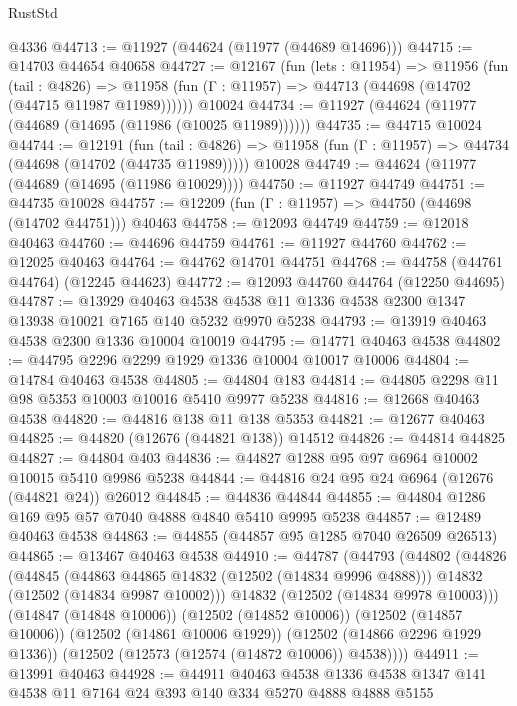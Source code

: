 \begin{lexlean}{RustStd}
\begin{coremodule}
    @4336
@44713 := @11927 (@44624 (@11977 (@44689 @14696)))
@44715 := @14703 @44654 @40658
@44727 := @12167
    (fun (lets : @11954) =>
    @11956
      (fun (tail : @4826) =>
      @11958 (fun (Γ : @11957) => @44713 (@44698 (@14702 (@44715 @11987 @11989))))))
    @10024
@44734 := @11927 (@44624 (@11977 (@44689 (@14695 (@11986 (@10025 @11989))))))
@44735 := @44715 @10024
@44744 := @12191
    (fun (tail : @4826) => @11958 (fun (Γ : @11957) => @44734 (@44698 (@14702 (@44735 @11989)))))
    @10028
@44749 := @44624 (@11977 (@44689 (@14695 (@11986 @10029))))
@44750 := @11927 @44749
@44751 := @44735 @10028
@44757 := @12209 (fun (Γ : @11957) => @44750 (@44698 (@14702 @44751))) @40463
@44758 := @12093 @44749
@44759 := @12018 @40463
@44760 := @44696 @44759
@44761 := @11927 @44760
@44762 := @12025 @40463
@44764 := @44762 @14701 @44751
@44768 := @44758 (@44761 @44764) (@12245 @44623)
@44772 := @12093 @44760 @44764 (@12250 @44695)
@44787 := @13929
    @40463
    @4538
    @4538
    @11
    @1336
    @4538
    @2300
    @1347
    @13938
    @10021
    @7165
    @140
    @5232
    @9970
    @5238
@44793 := @13919 @40463 @4538 @2300 @1336 @10004 @10019
@44795 := @14771 @40463 @4538
@44802 := @44795 @2296 @2299 @1929 @1336 @10004 @10017 @10006
@44804 := @14784 @40463 @4538
@44805 := @44804 @183
@44814 := @44805 @2298 @11 @98 @5353 @10003 @10016 @5410 @9977 @5238
@44816 := @12668 @40463 @4538
@44820 := @44816 @138 @11 @138 @5353
@44821 := @12677 @40463
@44825 := @44820 (@12676 (@44821 @138)) @14512
@44826 := @44814 @44825
@44827 := @44804 @403
@44836 := @44827 @1288 @95 @97 @6964 @10002 @10015 @5410 @9986 @5238
@44844 := @44816 @24 @95 @24 @6964 (@12676 (@44821 @24)) @26012
@44845 := @44836 @44844
@44855 := @44804 @1286 @169 @95 @57 @7040 @4888 @4840 @5410 @9995 @5238
@44857 := @12489 @40463 @4538
@44863 := @44855 (@44857 @95 @1285 @7040 @26509 @26513)
@44865 := @13467 @40463 @4538
@44910 := @44787
    (@44793
      (@44802
        (@44826
          (@44845
            (@44863 @44865 @14832 (@12502 (@14834 @9996 @4888)))
            @14832
            (@12502 (@14834 @9987 @10002)))
          @14832
          (@12502 (@14834 @9978 @10003)))
        (@14847 (@14848 @10006))
        (@12502 (@14852 @10006))
        (@12502 (@14857 @10006))
        (@12502 (@14861 @10006 @1929))
        (@12502 (@14866 @2296 @1929 @1336))
        (@12502 (@12573 (@12574 (@14872 @10006)) @4538))))
@44911 := @13991 @40463
@44928 := @44911
    @40463
    @4538
    @1336
    @4538
    @1347
    @141
    @4538
    @11
    @7164
    @24
    @393
    @140
    @334
    @5270
    @4888
    @4888
    @5155

\end{coremodule}
\end{lexlean}
